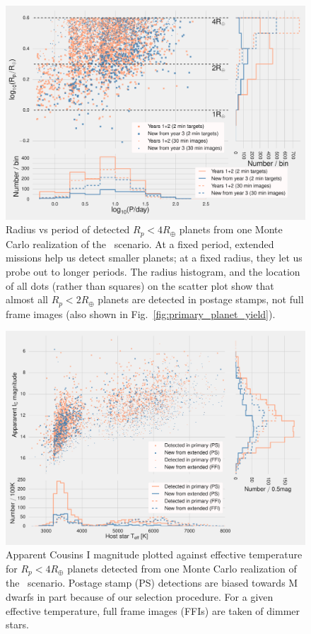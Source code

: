 \begin{figure}[t]
	\centering
	\includegraphics[]{figures/logR_vs_logP.pdf}
	\caption{Radius vs period of detected $R_p<4R_\oplus$ planets from one Monte Carlo realization of the \nhemi\ scenario.
	At a fixed period, extended missions help us detect smaller planets; at a fixed radius, they let us probe out to longer periods.
	The radius histogram, and the location of all dots (rather than squares) on the scatter plot show that almost all $R_p<2R_\oplus$ planets are detected in postage stamps, not full frame images (also shown in Fig.~\protect\ref{fig:primary_planet_yield}).}
	\label{fig:radius_vs_period_nhemi}
\end{figure}
\begin{figure}[t]
	\centering
	\includegraphics[]{figures/temp_imag_vs_teff_nhemi.pdf}
	\caption{Apparent Cousins I magnitude plotted against effective temperature for $R_p<4R_\oplus$ planets detected from one Monte Carlo realization of the \nhemi\ scenario. 
	Postage stamp (PS) detections are biased towards M dwarfs in part because of our selection procedure.
	For a given effective temperature, full frame images (FFIs) are taken of dimmer stars.}
	\label{fig:imag_vs_teff_nhemi}
\end{figure}

